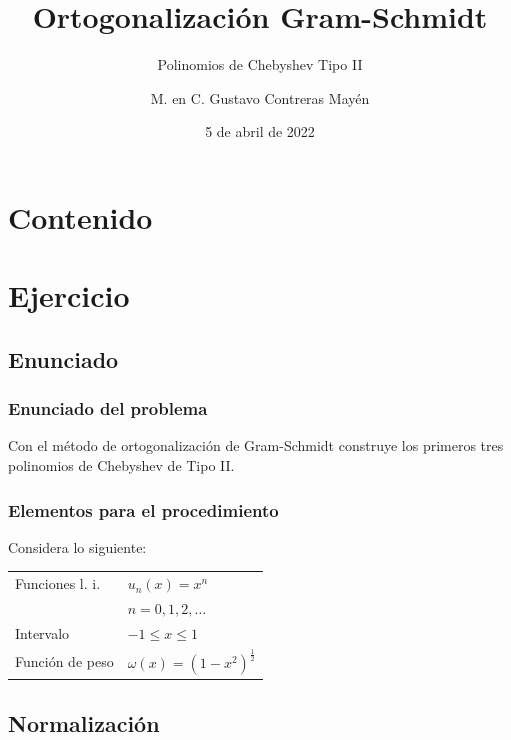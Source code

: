 \documentclass[12pt]{beamer}
\date{5 de abril de 2022}
\title{\large{Ortogonalización Gram-Schmidt}}
\subtitle{Polinomios de Chebyshev Tipo II}
\author{M. en C. Gustavo Contreras Mayén}
\begin{document}
\maketitle
\fontsize{14}{14}\selectfont
{}

\section*{Contenido}

\section{Ejercicio}
\subsection{Enunciado}

\begin{frame}
\frametitle{Enunciado del problema}
Con el método de ortogonalización de Gram-Schmidt construye los primeros tres polinomios de Chebyshev de Tipo II.
\end{frame}
\begin{frame}
\frametitle{Elementos para el procedimiento}
Considera lo siguiente:
\pause
\begin{table}
\begin{tabular}{l l}
Funciones l. i. & $u_{n}(x) = x^{n}$ \\
 & $n = 0, 1, 2, \ldots$ \\ \pause
Intervalo & $-1 \leq x \leq 1$ \\ \pause
Función de peso & $\omega (x) = (1 -x^{2})^{\frac{1}{2}}$
\end{tabular}
\end{table}
\end{frame}

\subsection{Normalización}
\end{document}
